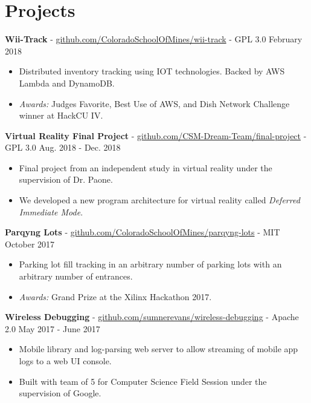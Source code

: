 \documentclass[10pt,letterpaper]{article}
\begin{document}
\section*{Projects}
\textbf{Wii-Track} -
\href{https://github.com/ColoradoSchoolOfMines/wii-track}{github.com/ColoradoSchoolOfMines/wii-track}
- GPL 3.0 \hfill February 2018
\begin{itemize}
    \item Distributed inventory tracking using IOT technologies. Backed by AWS
        Lambda and DynamoDB.
    \item \textit{Awards:} Judges Favorite, Best Use of AWS, and Dish Network
        Challenge winner at HackCU IV.
\end{itemize}


\textbf{Virtual Reality Final Project} -
\href{https://github.com/CSM-Dream-Team/final-project}{github.com/CSM-Dream-Team/final-project}
- GPL 3.0 \hfill Aug. 2018 - Dec. 2018
\begin{itemize}
    \item Final project from an independent study in virtual reality under the
        supervision of Dr. Paone.
    \item We developed a new program architecture for virtual reality called
        \textit{Deferred Immediate Mode}.
\end{itemize}

\textbf{Parqyng Lots} -
\href{https://github.com/ColoradoSchoolOfMines/parqyng-lots}{github.com/ColoradoSchoolOfMines/parqyng-lots}
- MIT \hfill October 2017
\begin{itemize}
    \item Parking lot fill tracking in an arbitrary number of parking lots with
        an arbitrary number of entrances.
    \item \textit{Awards:} Grand Prize at the Xilinx Hackathon 2017.
\end{itemize}

\textbf{Wireless Debugging} -
\href{https://github.com/sumnerevans/wireless-debugging}{github.com/sumnerevans/wireless-debugging}
- Apache 2.0 \hfill May 2017 - June 2017
\begin{itemize}
    \item Mobile library and log-parsing web server to allow streaming of mobile app
        logs to a web UI console.
    \item Built with team of 5 for Computer Science Field Session under the
        supervision of Google.
\end{itemize}
\end{document}
